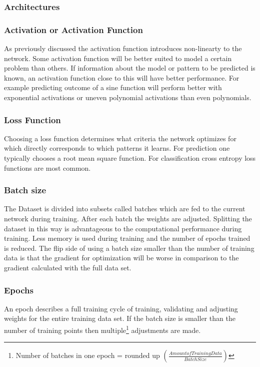 			\subsubsection{Architectures}
			\subsubsection{Activation or Activation Function}
				As previously discussed the activation function introduces non-linearty to the network. Some activation function will be better suited to model a certain problem than others. If information about the model or pattern to be predicted is known, an activation function close to this will have better performance. For example predicting outcome of a sine function will perform better with exponential activations or uneven polynomial activations than even polynomials.%
			\subsubsection{Loss Function}
				Choosing a loss function determines what criteria the network optimizes for which directly corresponds to which patterns it learns. For prediction one typically chooses a root mean square function. For classification cross entropy loss functions are most common.
			\subsubsection{Batch size}
				The Dataset is divided into subsets called batches which are fed to the current network during training. After each batch the weights are adjusted. Splitting the dataset in this way is advantageous to the computational performance during training. Less memory is used during training and the number of epochs trained is reduced. The flip side of using a batch size smaller than the number of training data is that the gradient for optimization will be worse in comparison to the gradient calculated with the full data set. 
			\subsubsection{Epochs}
				An epoch describes a full training cycle of training, validating and adjusting weights for the entire training data set. If the batch size is smaller than the number of training points then multiple\footnote{Number of batches in one epoch = rounded up $\left(\frac{Amount of Training Data}{Batch Size}\right)$} adjustments are made.%
